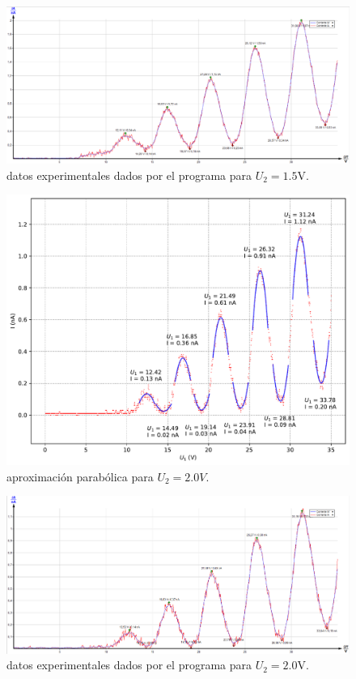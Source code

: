 \documentclass[12pt,a4paper]{article}
\numberwithin{equation}{section}
\numberwithin{figure}{section}
\begin{document}
\begin{figure}[h!]  \centering
\includegraphics[scale=0.4]{1_5-2.png}
\caption{datos experimentales dados por el programa para $U_2=1.5$V.}
\label{Fig:3.51}
\end{figure}
\newpage
\begin{figure}[h!]  \centering
\includegraphics[scale=0.7]{Parabola-6.pdf}
\caption{aproximación parabólica para $U_2=2.0V$.}
\label{Fig:2.6}
\end{figure}

\begin{figure}[h!]  \centering
\includegraphics[scale=0.4]{2_0-2.png}
\caption{datos experimentales dados por el programa para $U_2=2.0$V.}
\label{Fig:3.61}
\end{figure}
\end{document}
